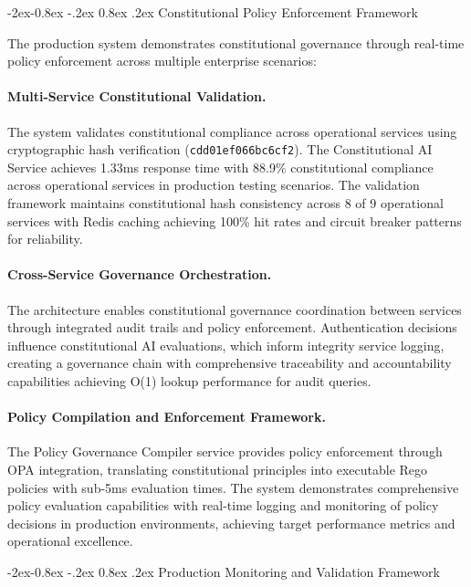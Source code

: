 \documentclass[manuscript,screen,9pt]{acmart}
\makeatletter
\renewcommand\subsubsection{\@startsection{subsubsection}{3}{\z@}%
  {-2ex\@plus -0.8ex \@minus -.2ex}%
  {0.8ex \@plus .2ex}%
  {\normalfont\normalsize\bfseries}}
\makeatother
\begin{document}
\subsubsection{Constitutional Policy Enforcement Framework}
\label{subsubsec:policy_enforcement_framework}

The production system demonstrates constitutional governance through real-time policy enforcement across multiple enterprise scenarios:

\paragraph{Multi-Service Constitutional Validation.} The system validates constitutional compliance across operational services using cryptographic hash verification (\texttt{cdd01ef066bc6cf2\cite{perf-report}\cite{perf-report}}). The Constitutional AI Service achieves 1.33ms response time with 88.9\% constitutional compliance across operational services in production testing scenarios. The validation framework maintains constitutional hash consistency across 8 of 9 operational services with Redis caching achieving 100\% hit rates and circuit breaker patterns for reliability.

\paragraph{Cross-Service Governance Orchestration.} The architecture enables constitutional governance coordination between services through integrated audit trails and policy enforcement. Authentication decisions influence constitutional AI evaluations, which inform integrity service logging, creating a governance chain with comprehensive traceability and accountability capabilities achieving O(1) lookup performance for audit queries.

\paragraph{Policy Compilation and Enforcement Framework.} The Policy Governance Compiler service provides policy enforcement through OPA integration, translating constitutional principles into executable Rego policies with sub-5ms evaluation times. The system demonstrates comprehensive policy evaluation capabilities with real-time logging and monitoring of policy decisions in production environments, achieving target performance metrics and operational excellence.

\subsubsection{Production Monitoring and Validation Framework}
\label{subsubsec:production_monitoring}
\end{document}
